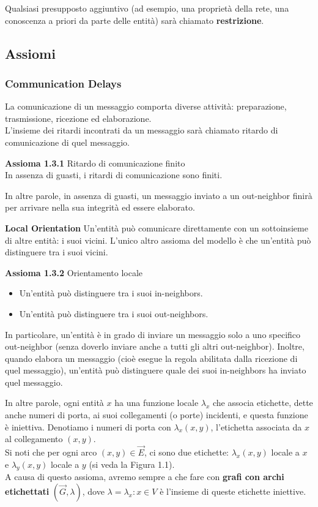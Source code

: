 Qualsiasi presupposto aggiuntivo (ad esempio, una proprietà della rete, una conoscenza a priori da parte delle entità) sarà chiamato \textbf{restrizione}.

\subsection{Assiomi}
\subsubsection{Communication Delays}
La comunicazione di un messaggio comporta diverse attività: preparazione, trasmissione, ricezione ed elaborazione.\\
L'insieme dei ritardi incontrati da un messaggio sarà chiamato ritardo di comunicazione di quel messaggio.

\textbf{Assioma 1.3.1} Ritardo di comunicazione finito\\
In assenza di guasti, i ritardi di comunicazione sono finiti.

In altre parole, in assenza di guasti, un messaggio inviato a un out-neighbor finirà per arrivare nella sua integrità ed essere elaborato. 

\textbf{Local Orientation}
Un'entità può comunicare direttamente con un sottoinsieme di altre entità: i suoi vicini. L'unico altro assioma del modello è che un'entità può distinguere tra i suoi vicini.

\textbf{Assioma 1.3.2} Orientamento locale\\
\begin{itemize}
    \item Un'entità può distinguere tra i suoi in-neighbors.
    \item Un'entità può distinguere tra i suoi out-neighbors.
\end{itemize}

In particolare, un'entità è in grado di inviare un messaggio solo a uno specifico out-neighbor (senza doverlo inviare anche a tutti gli altri out-neighbor). Inoltre, quando elabora un messaggio (cioè esegue la regola abilitata dalla ricezione di quel messaggio), un'entità può distinguere quale dei suoi in-neighbors ha inviato quel messaggio.

In altre parole, ogni entità $x$ ha una funzione locale $\lambda_x$ che associa etichette, dette anche numeri di porta, ai suoi collegamenti (o porte) incidenti, e questa funzione è iniettiva. Denotiamo i numeri di porta con $\lambda_x (x, y)$, l'etichetta associata da $x$ al collegamento $(x, y)$.\\
Si noti che per ogni arco $(x, y) \in \overrightarrow{E}$, ci sono due etichette: $\lambda_x (x, y)$ locale a $x$ e $\lambda_y (x, y)$ locale a $y$ (si veda la Figura 1.1).\\
A causa di questo assioma, avremo sempre a che fare con \textbf{grafi con archi etichettati} $(\overrightarrow{G}, \lambda)$, dove $\lambda = {\lambda_x : x \in V }$ è l'insieme di queste etichette iniettive.

